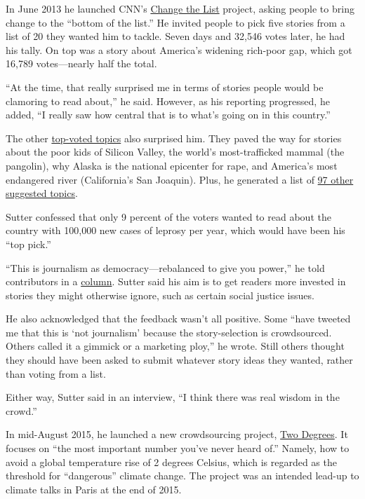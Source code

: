 \begin{itemize}
\begin{enumerate}
In June 2013 he launched CNN’s \href{http://www.cnn.com/specials/opinion/change-the-list}{Change the List} project, asking people to bring change to the ``bottom of the list.''\autocite{CNN} He invited people to pick five stories from a list of 20 they wanted him to tackle. Seven days and 32,546 votes later, he had his tally. On top was a story about America’s widening rich-poor gap, which got 16,789 votes---nearly half the total.

``At the time, that really surprised me in terms of stories people would be clamoring to read about,'' he said.\autocite{CNN} However, as his reporting progressed, he added, ``I really saw how central that is to what’s going on in this country.''

The other \href{http://www.cnn.com/2013/06/18/opinion/sutter-ctl-vote-results/}{top-voted topics} also surprised him.\autocite{column} They paved the way for stories about the poor kids of Silicon Valley, the world’s most-trafficked mammal (the pangolin), why Alaska is the national epicenter for rape, and America’s most endangered river (California’s San Joaquin). Plus, he generated a list of \href{http://www.cnn.com/2013/06/14/opinion/sutter-ctl-97-ideas/index.html?hpt=hp_c4}{97 other suggested topics}.\autocite{column} 

Sutter confessed that only 9 percent of the voters wanted to read about the country with 100,000 new cases of leprosy per year, which would have been his ``top pick.''

``This is journalism as democracy---rebalanced to give you power,'' he told contributors in a \href{http://www.cnn.com/2013/06/18/opinion/sutter-ctl-vote-results/index.html}{column}.\autocite{column} Sutter said his aim is to get readers more invested in stories they might otherwise ignore, such as certain social justice issues.  

He also acknowledged that the feedback wasn’t all positive. Some 
``have tweeted me that this is ‘not journalism’ because the story-selection is crowdsourced. Others called it a gimmick or a marketing ploy,'' he wrote.\autocite{column} Still others thought they should have been asked to submit whatever story ideas they wanted, rather than voting from a list. 

Either way, Sutter said in an interview, ``I think there was real wisdom in the crowd.''\autocite{CNN}

In mid-August 2015, he launched a new crowdsourcing project, \href{http://www.cnn.com/specials/opinions/two-degrees}{Two Degrees}. It focuses on ``the most important number you’ve never heard of.'' Namely, how to avoid a global temperature rise of 2 degrees Celsius, which is regarded as the threshold for ``dangerous'' climate change.\autocite{CNN} The project was an intended lead-up to climate talks in Paris at the end of 2015. 


\end{enumerate}
\end{itemize}
